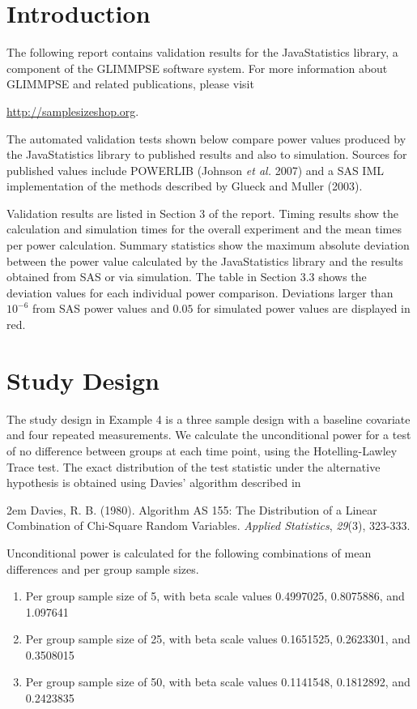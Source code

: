 \documentclass{glimmpse-report}
\begin{document}
\section{Introduction}
The following report contains validation results for the JavaStatistics library, a component of the GLIMMPSE software system.  For more information about GLIMMPSE and related publications, please visit

 

\href{http://samplesizeshop.org}{http://samplesizeshop.org}.

The automated validation tests shown below compare power values produced by the JavaStatistics library to published results and also to simulation.  Sources for published values include POWERLIB (Johnson \emph{et al.} 2007) and a SAS IML implementation of the methods described by Glueck and Muller (2003).

Validation results are listed in Section 3 of the report.  Timing results show the calculation and simulation times for the overall experiment and the mean times per power calculation.  Summary statistics show the maximum absolute deviation between the power value calculated by the JavaStatistics library and the results obtained from SAS or via simulation.  The table in Section 3.3 shows the deviation values for each individual power comparison.  Deviations larger than $10^{-6}$ from SAS power values and $0.05$ for simulated power values are displayed in red.

 \section{Study Design}
The study design in Example 4 is a three sample design with a baseline covariate and four repeated measurements.  We calculate the unconditional power for a test of no difference between groups at each time point, using the Hotelling-Lawley Trace test.  The exact distribution of the test statistic under the alternative hypothesis is obtained using Davies' algorithm described in 

\hangindent2em
 Davies, R. B. (1980). Algorithm AS 155: The Distribution of a Linear Combination of Chi-Square Random Variables. \emph{Applied Statistics}, \emph{29}(3), 323-333.

Unconditional power is calculated for the following combinations of mean differences and per group sample sizes.

\begin{enumerate}\item Per group sample size of 5, with beta scale values 0.4997025, 0.8075886, and 1.097641\item Per group sample size of 25, with beta scale values 0.1651525, 0.2623301, and 0.3508015\item Per group sample size of 50, with beta scale values 0.1141548,  0.1812892, and  0.2423835
\end{enumerate}
\end{document}
